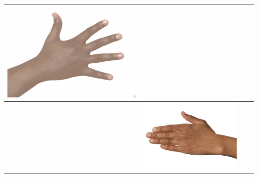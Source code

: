 \begin{longtable}{|N||c|c|c|}
\begin{minipage}{.29\textwidth}
    \includegraphics[width=\textwidth,height=\textheight,keepaspectratio]{../rc_test/outputs/20170517_proportional_corrected_test_alpha10/hand_dark_to_hand_pale.jpg}
  \end{minipage} \\
\hline  \label{row:prop_correct_test_a10_hand_brown_to_hand_dark} &
  \begin{minipage}{.29\textwidth}
    \includegraphics[width=\textwidth,height=\textheight,keepaspectratio]{../inputs/hand_brown.jpg}
  \end{minipage} & 
  \begin{minipage}{.29\textwidth}

\end{minipage}
\end{longtable}
